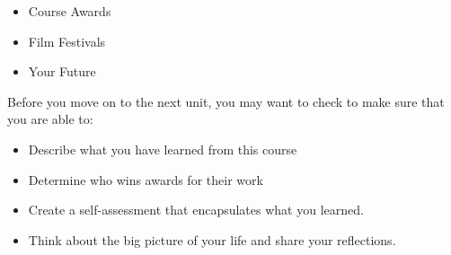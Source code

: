 \documentclass[
  letterpaper,
  DIV=11,
  numbers=noendperiod]{scrreprt}
\providecommand{\tightlist}{%
  \setlength{\itemsep}{0pt}\setlength{\parskip}{0pt}}\usepackage{longtable,booktabs,array}
\begin{document}
\begin{itemize}
\tightlist
\item
  Course Awards
\item
  Film Festivals
\item
  Your Future
\end{itemize}

\begin{tcolorbox}[enhanced jigsaw, opacityback=0, colframe=quarto-callout-note-color-frame, leftrule=.75mm, arc=.35mm, rightrule=.15mm, colbacktitle=quarto-callout-note-color!10!white, titlerule=0mm, colback=white, toprule=.15mm, bottomtitle=1mm, breakable, toptitle=1mm, title={Checking Your Learning}, coltitle=black, bottomrule=.15mm, left=2mm, opacitybacktitle=0.6]

Before you move on to the next unit, you may want to check to make sure
that you are able to:

\begin{itemize}
\tightlist
\item
  Describe what you have learned from this course
\item
  Determine who wins awards for their work
\item
  Create a self-assessment that encapsulates what you learned.
\item
  Think about the big picture of your life and share your reflections.
\end{itemize}

\end{tcolorbox}
\end{document}

